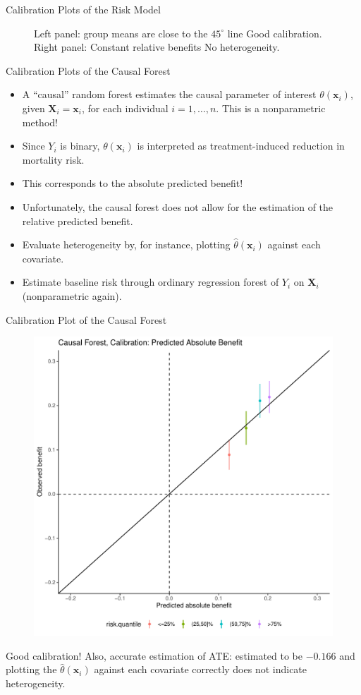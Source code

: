 \documentclass[11pt]{beamer}
\begin{document}
\begin{frame}{Calibration Plots of the Risk Model}
\begin{figure}
Left panel: group means are close to the $45^\circ$ line  Good calibration. 		
Right panel: Constant relative benefits  No heterogeneity.
\end{figure}
\end{frame}

\begin{frame}{Calibration Plots of the Causal Forest}
\begin{itemize}
\item A ``causal'' random forest \citep{athey2019grf} estimates the causal parameter of interest $\theta(\mathbf{x}_i)$, given $\mathbf{X}_i = \mathbf{x}_i$, for each individual $i=1,\dots,n$. This is a nonparametric method!
\item Since $Y_i$ is binary, $\theta(\mathbf{x}_i)$ is interpreted as treatment-induced reduction in mortality risk.
\item[\ding{212}] This corresponds to the absolute predicted benefit!
\item Unfortunately, the causal forest does not allow for the estimation of the relative predicted benefit.
\item[\ding{212}] Evaluate heterogeneity by, for instance, plotting $\hat{\theta}(\mathbf{x}_i)$ against each covariate.
\item Estimate baseline risk through ordinary regression forest of $Y_i$ on $\mathbf{X}_i$ (nonparametric again).
\end{itemize}
\end{frame}

\begin{frame}{Calibration Plot of the Causal Forest}
\begin{figure}
\centering
		\includegraphics[width=0.5\linewidth]{plots/const-cf-calibration-absolute.pdf}
\end{figure}
Good calibration! Also, accurate estimation of ATE: estimated to be $-0.166$ and plotting the $\hat{\theta}(\mathbf{x}_i)$ against each covariate correctly does not indicate heterogeneity.
\end{frame}
\end{document}
